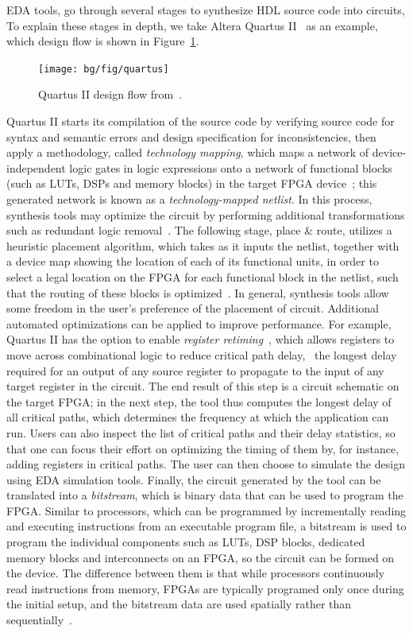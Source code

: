 EDA tools, go through several stages to synthesize HDL source code
into circuits, To explain these stages in depth, we take Altera
Quartus II~\cite{quartus} as an example, which design flow is shown in
Figure~\ref{fig:quartus}.
\begin{figure}[ht]
    \centering
    \texttt{[image: bg/fig/quartus]}
    \caption{Quartus II design flow from~\cite{quartus}.}\label{fig:quartus}
\end{figure}

Quartus II starts its compilation of the source code by verifying source code
for syntax and semantic errors and design specification for inconsistencies,
then apply a methodology, called \emph{technology mapping}, which maps
a network of device-independent logic gates in logic expressions onto a
network of functional blocks (such as LUTs, DSPs and memory blocks) in
the target FPGA device~\cite{cong08}; this generated network is known as
a \emph{technology-mapped netlist}.  In this process, synthesis tools may
optimize the circuit by performing additional transformations such as redundant
logic removal~\cite{quartus}.  The following stage, place \& route, utilizes a
heuristic placement algorithm, which takes as it inputs the netlist, together
with a device map showing the location of each of its functional units, in
order to select a legal location on the FPGA for each functional block in the
netlist, such that the routing of these blocks is optimized~\cite{betz08}.
In general, synthesis tools allow some freedom in the user's preference of
the placement of circuit.  Additional automated optimizations can be applied
to improve performance.  For example, Quartus II has the option to enable
\emph{register retiming}~\cite{quartus}, which allows registers to move across
combinational logic to reduce critical path delay, \ie~the longest delay
required for an output of any source register to propagate to the input of
any target register in the circuit.  The end result of this step is a circuit
schematic on the target FPGA\@; in the next step, the tool thus computes
the longest delay of all critical paths, which determines the frequency at
which the application can run.  Users can also inspect the list of critical
paths and their delay statistics, so that one can focus their effort on
optimizing the timing of them by, for instance, adding registers in critical
paths.  The user can then choose to simulate the design using EDA simulation
tools.  Finally, the circuit generated by the tool can be translated into a
\emph{bitstream}, which is binary data that can be used to program the FPGA\@.
Similar to processors, which can be programmed by incrementally reading and
executing instructions from an executable program file, a bitstream is used
to program the individual components such as LUTs, DSP blocks, dedicated
memory blocks and interconnects on an FPGA, so the circuit can be formed on
the device.  The difference between them is that while processors continuously
read instructions from memory, FPGAs are typically programed only once during
the initial setup, and the bitstream data are used spatially rather than
sequentially~\cite{guccione08}.
